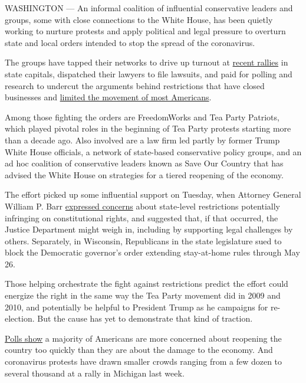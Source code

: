 WASHINGTON --- An informal coalition of influential conservative leaders
and groups, some with close connections to the White House, has been
quietly working to nurture protests and apply political and legal
pressure to overturn state and local orders intended to stop the spread
of the coronavirus.

The groups have tapped their networks to drive up turnout at
\href{https://www.nytimes3xbfgragh.onion/2020/04/18/us/texas-protests-stay-at-home.html}{recent
rallies} in state capitals, dispatched their lawyers to file lawsuits,
and paid for polling and research to undercut the arguments behind
restrictions that have closed businesses and
\href{https://www.nytimes3xbfgragh.onion/interactive/2020/us/coronavirus-stay-at-home-order.html}{limited
the movement of most Americans}.

Among those fighting the orders are FreedomWorks and Tea Party Patriots,
which played pivotal roles in the beginning of Tea Party protests
starting more than a decade ago. Also involved are a law firm led partly
by former Trump White House officials, a network of state-based
conservative policy groups, and an ad hoc coalition of conservative
leaders known as Save Our Country that has advised the White House on
strategies for a tiered reopening of the economy.

The effort picked up some influential support on Tuesday, when Attorney
General William P. Barr
\href{https://www.hughhewitt.com/attorney-general-william-barr-on-the-crisis/}{expressed
concerns} about state-level restrictions potentially infringing on
constitutional rights, and suggested that, if that occurred, the Justice
Department might weigh in, including by supporting legal challenges by
others. Separately, in Wisconsin, Republicans in the state legislature
sued to block the Democratic governor's order extending stay-at-home
rules through May 26.

Those helping orchestrate the fight against restrictions predict the
effort could energize the right in the same way the Tea Party movement
did in 2009 and 2010, and potentially be helpful to President Trump as
he campaigns for re-election. But the cause has yet to demonstrate that
kind of traction.

\href{https://www.nbcnews.com/politics/meet-the-press/poll-six-10-support-keeping-stay-home-restrictions-fight-coronavirus-n1187011}{Polls
show} a majority of Americans are more concerned about reopening the
country too quickly than they are about the damage to the economy. And
coronavirus protests have drawn smaller crowds ranging from a few dozen
to several thousand at a rally in Michigan last week.

